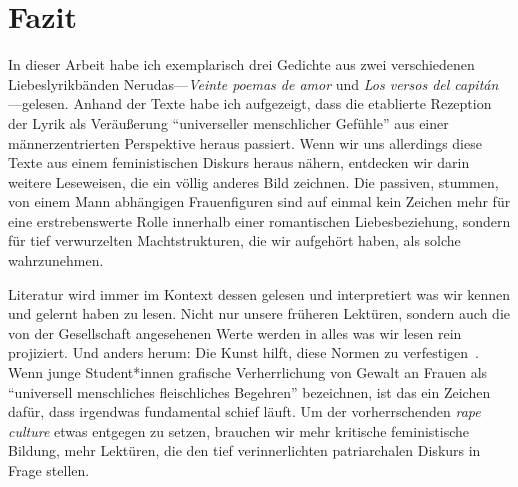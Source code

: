 \section{Fazit}

In dieser Arbeit habe ich exemplarisch drei Gedichte aus zwei verschiedenen Liebeslyrikbänden Nerudas—\textit{Veinte poemas de amor} und \textit{Los versos del capitán}—gelesen.
Anhand der Texte habe ich aufgezeigt, dass die etablierte Rezeption der Lyrik als Veräußerung ``universeller menschlicher Gefühle'' aus einer männerzentrierten Perspektive heraus passiert.
Wenn wir uns allerdings diese Texte aus einem feministischen Diskurs heraus nähern, entdecken wir darin weitere Leseweisen, die ein völlig anderes Bild zeichnen.
Die passiven, stummen, von einem Mann abhängigen Frauenfiguren sind auf einmal kein Zeichen mehr für eine erstrebenswerte Rolle innerhalb einer romantischen Liebesbeziehung, sondern für tief verwurzelten Machtstrukturen, die wir aufgehört haben, als solche wahrzunehmen.

Literatur wird immer im Kontext dessen gelesen und interpretiert was wir kennen und gelernt haben zu lesen.
Nicht nur unsere früheren Lektüren, sondern auch die von der Gesellschaft angesehenen Werte werden in alles was wir lesen rein projiziert.
Und anders herum: Die Kunst hilft, diese Normen zu verfestigen~\cite{Kolodny1980}.
Wenn junge Student*innen grafische Verherrlichung von Gewalt an Frauen als ``universell menschliches fleischliches Begehren'' bezeichnen, ist das ein Zeichen dafür, dass irgendwas fundamental schief läuft.
Um der vorherrschenden \textit{rape culture} etwas entgegen zu setzen, brauchen wir mehr kritische feministische Bildung, mehr Lektüren, die den tief verinnerlichten patriarchalen Diskurs in Frage stellen.

\begin{comment}
* "als nah, natürlich wahrgenommen", die Leser*innen können sich damit identifizieren
  ** Duncan spricht von "real", "natural/beautiful expression of male/female relationships", die Menschen können sich damit identifizieren, sie sehen die Gedichte als Reflexion der gesellschaftlichen Idealen, die sie gelernt haben anzustreben
  ** Duncan:  "a sort of manual on the workings of modern romantic love and have come  to be regarded by many, as a standard agains which real life  relationships can be judged"
  ** Duncan: ".. in fact it seems extraordinarily "real" and "natural", as if it were not a literary construct at all, but, rather a reflection of real-life experiences. Readers who turn to these poems to learn "what love is supposed to be like", "what men are like", and "what women are like", ultimately receive a skewed message told from the traditional dominant male position"
\end{comment}

